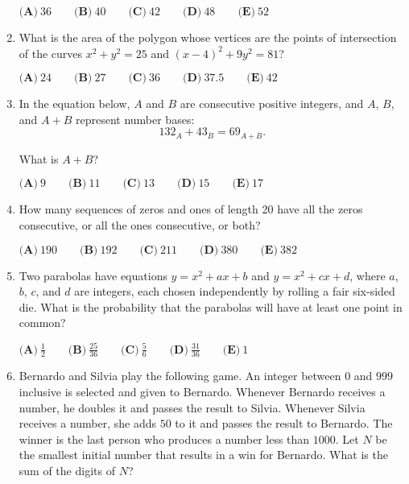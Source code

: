 \documentclass{article}
\begin{document}
\begin{enumerate}[label=\arabic*., itemsep=0.5em]
\(\textbf{(A)}\ 36\qquad\textbf{(B)}\ 40\qquad\textbf{(C)}\ 42\qquad\textbf{(D)}\ 48\qquad\textbf{(E)}\ 52 \)\par \vspace{0.5em}\item What is the area of the polygon whose vertices are the points of intersection of the curves \(x^2 + y^2 =25\) and \((x-4)^2 + 9y^2 = 81\)?

\(\textbf{(A)}\ 24\qquad\textbf{(B)}\ 27\qquad\textbf{(C)}\ 36\qquad\textbf{(D)}\ 37.5\qquad\textbf{(E)}\ 42\)\par \vspace{0.5em}\item In the equation below, \(A\) and \(B\) are consecutive positive integers, and \(A\), \(B\), and \(A+B\) represent number bases: 
\begin{equation*}
132_A+43_B=69_{A+B}.
\end{equation*}

What is \(A+B\)?

\(\textbf{(A)}\ 9\qquad\textbf{(B)}\ 11\qquad\textbf{(C)}\ 13\qquad\textbf{(D)}\ 15\qquad\textbf{(E)}\ 17 \)\par \vspace{0.5em}\item How many sequences of zeros and ones of length 20 have all the zeros consecutive, or all the ones consecutive, or both?

\(\textbf{(A)}\ 190\qquad\textbf{(B)}\ 192\qquad\textbf{(C)}\ 211\qquad\textbf{(D)}\ 380\qquad\textbf{(E)}\ 382 \)\par \vspace{0.5em}\item Two parabolas have equations \(y= x^2 + ax +b\) and \(y= x^2 + cx +d\), where \(a\), \(b\), \(c\), and \(d\) are integers, each chosen independently by rolling a fair six-sided die. What is the probability that the parabolas will have at least one point in common?

\(\textbf{(A)}\ \frac{1}{2}\qquad\textbf{(B)}\ \frac{25}{36}\qquad\textbf{(C)}\ \frac{5}{6}\qquad\textbf{(D)}\ \frac{31}{36}\qquad\textbf{(E)}\ 1 \)\par \vspace{0.5em}\item Bernardo and Silvia play the following game. An integer between \(0\) and \(999\) inclusive is selected and given to Bernardo. Whenever Bernardo receives a number, he doubles it and passes the result to Silvia. Whenever Silvia receives a number, she adds \(50\) to it and passes the result to Bernardo. The winner is the last person who produces a number less than \(1000\). Let \(N\) be the smallest initial number that results in a win for Bernardo. What is the sum of the digits of \(N\)?


\end{enumerate}
\end{document}
